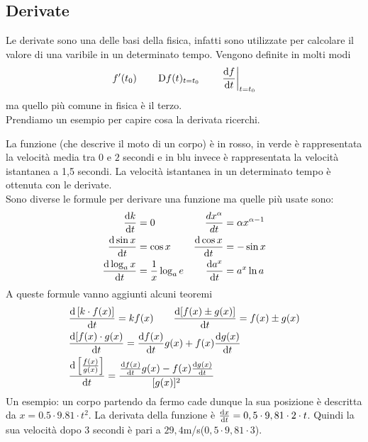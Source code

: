 \subsection{Derivate}
Le derivate sono una delle basi della fisica, infatti sono utilizzate per calcolare il valore di 
una varibile in un determinato tempo. Vengono definite in molti modi 
\begin{equation*}
  f'(t_0) \qquad \mathop{}\!\mathrm{D} f(t)_{t=t_0}\qquad \left.\frac{\mathop{}\!\mathrm{d} f}{\mathop{}\!\mathrm{d} t}\right|_{t=t_0}
\end{equation*}
ma quello più comune in fisica è il terzo.\\
Prendiamo un esempio per capire cosa la derivata ricerchi.
\begin{center}
\end{center}
La funzione (che descrive il moto di un corpo) è in rosso, in verde è rappresentata la velocità 
media tra $0$ e $2$ secondi e in blu invece è rappresentata la velocità istantanea a 1,5 secondi. 
La velocità istantanea in un determinato tempo è ottenuta con le derivate.\\
Sono diverse le formule per derivare una funzione ma quelle più usate sono:
\begin{align*}
  \frac{\dif k}{\dif t}&=0 &\quad \frac{dx^\alpha}{dt}&=\alpha x^{\alpha-1}\\
  \frac{\dif\sin x}{\dif t}&=\cos x & \frac{\dif\cos x}{\dif t}&=-\sin x\\
  \frac{\dif\log_ax}{\dif t}&=\frac{1}{x}\log_ae & \frac{\dif a^{x}}{\dif t}&=a^{x}\ln a
\end{align*}
A queste formule vanno aggiunti alcuni teoremi
\begin{align*}
  &\frac{\dif\left[k\cdot f(x) \right]}{\dif t}=kf(x)\qquad
    \frac{\dif[f(x)\pm g(x)]}{\dif t}=f(x)\pm g(x)\\
  &\frac{\dif [f(x)\cdot g(x)}{\dif t}=\frac{\dif f(x)}{\dif t}g(x) + 
    f(x)\frac{\dif g(x)}{\dif t}\\
  &\frac{\dif \left[\frac{f(x)}{g(x)}\right]}{\dif t} =
    \frac{\frac{\dif f(x)}{\dif t}g(x)-f(x)\frac{\dif g(x)}{\dif t}}{[g(x)]^2}
\end{align*}
Un esempio: un corpo partendo da fermo cade dunque la sua posizione è descritta da 
$x=0.5\cdot9.81\cdot t^{2}$. La derivata della funzione è 
$\frac{\mathop{}\!\mathrm{d} x}{\mathop{}\!\mathrm{d} t}=0,5\cdot9,81\cdot2\cdot t$. 
Quindi la sua velocità dopo 3 secondi è pari a $29,4$m/s($0,5\cdot9,81\cdot3$).
